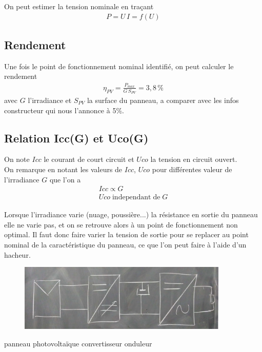 \documentclass[12pt,prb,aps,epsf]{article}
\begin{document}
On peut estimer la tension nominale en traçant 
\begin{eqnarray}
P = U\,I = f(U)
\end{eqnarray}

\subsection{Rendement}
Une fois le point de fonctionnement nominal identifié, on peut calculer le rendement 
\begin{eqnarray}
\eta_{PV} = \frac{P_{max}}{G\,S_{PV}} = 3,8\,\%
\end{eqnarray}
avec $G$ l'irradiance et $S_{PV}$ la surface du panneau, a comparer avec les infos constructeur qui nous l'annonce à 5\%.

\subsection{Relation Icc(G) et Uco(G)}
On note $Icc$ le courant de court circuit et $Uco$ la tension en circuit ouvert.\\

On remarque en notant les valeurs de $Icc$, $Uco$ pour différentes valeur de l'irradiance $G$ que l'on a 
\begin{eqnarray}
Icc \propto G\\
Uco \;\mathrm{independant\;de}\; G
\end{eqnarray}

Lorsque l'irradiance varie (nuage, poussière...) la résistance en sortie du panneau elle ne varie pas, et on se retrouve alors à un point de fonctionnement non optimal. Il faut donc faire varier la tension de sortie pour se replacer au point nominal de la caractéristique du panneau, ce que l'on peut faire à l'aide d'un hacheur.

\begin{figure}[h]
	\centering \includegraphics[width=10cm]{panneau}
\end{figure}
\centerline {panneau photovoltaïque\hspace{1.2cm}  convertisseur\hspace{1cm} onduleur \hspace{3cm}}
\end{document}
